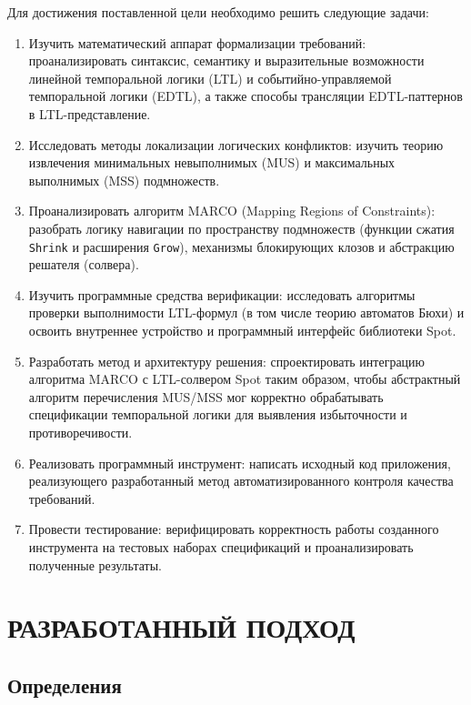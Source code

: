 Для достижения поставленной цели необходимо решить следующие задачи:
\begin{enumerate}
    \item Изучить математический аппарат формализации требований: проанализировать синтаксис, семантику и выразительные возможности линейной темпоральной логики (LTL) и событийно-управляемой темпоральной логики (EDTL), а также способы трансляции EDTL-паттернов в LTL-представление.
    
    \item Исследовать методы локализации логических конфликтов: изучить теорию извлечения минимальных невыполнимых (MUS) и максимальных выполнимых (MSS) подмножеств.
    
    \item Проанализировать алгоритм MARCO (Mapping Regions of Constraints): разобрать логику навигации по пространству подмножеств (функции сжатия \texttt{Shrink} и расширения \texttt{Grow}), механизмы блокирующих клозов и абстракцию решателя (солвера).
    
    \item Изучить программные средства верификации: исследовать алгоритмы проверки выполнимости LTL-формул (в том числе теорию автоматов Бюхи) и освоить внутреннее устройство и программный интерфейс библиотеки Spot.
    
    \item Разработать метод и архитектуру решения: спроектировать интеграцию алгоритма MARCO с LTL-солвером Spot таким образом, чтобы абстрактный алгоритм перечисления MUS/MSS мог корректно обрабатывать спецификации темпоральной логики для выявления избыточности и противоречивости.
    
    \item Реализовать программный инструмент: написать исходный код приложения, реализующего разработанный метод автоматизированного контроля качества требований.
    
    \item Провести тестирование: верифицировать корректность работы созданного инструмента на тестовых наборах спецификаций и проанализировать полученные результаты.
\end{enumerate}
\section{РАЗРАБОТАННЫЙ ПОДХОД}\label{sec:solution}

\subsection{Определения}\label{sec:definitions}

